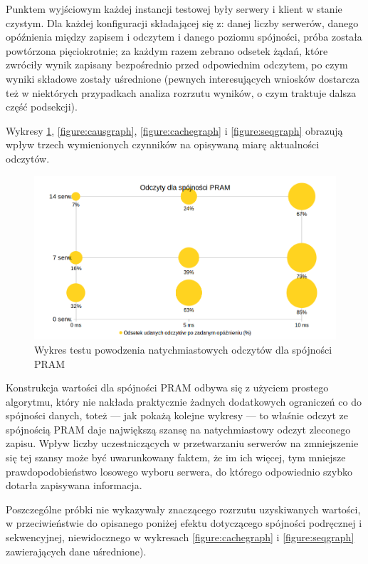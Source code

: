 Punktem wyjściowym każdej instancji testowej były serwery i klient w stanie czystym. Dla każdej konfiguracji składającej się z: danej liczby serwerów, danego opóźnienia między zapisem i odczytem i danego poziomu spójności, próba została powtórzona pięciokrotnie; za każdym razem zebrano odsetek żądań, które zwróciły wynik zapisany bezpośrednio przed odpowiednim odczytem, po czym wyniki składowe zostały uśrednione (pewnych interesujących wniosków dostarcza też w niektórych przypadkach analiza rozrzutu wyników, o czym traktuje dalsza część podsekcji).

Wykresy \ref{figure:pramgraph}, \ref{figure:causgraph}, \ref{figure:cachegraph} i \ref{figure:seqgraph} obrazują wpływ trzech wymienionych czynników na opisywaną miarę aktualności odczytów.

\begin{figure}[H]
    \includegraphics[width=\linewidth]{images/graphs/pram.png}
    \caption{Wykres testu powodzenia natychmiastowych odczytów dla spójności PRAM}
    \label{figure:pramgraph}
\end{figure}

Konstrukcja wartości dla spójności PRAM odbywa się z użyciem prostego algorytmu, który nie nakłada praktycznie żadnych dodatkowych ograniczeń co do spójności danych, toteż --- jak pokażą kolejne wykresy --- to właśnie odczyt ze spójnością PRAM daje największą szansę na natychmiastowy odczyt zleconego zapisu. Wpływ liczby uczestniczących w przetwarzaniu serwerów na zmniejszenie się tej szansy może być uwarunkowany faktem, że im ich więcej, tym mniejsze prawdopodobieństwo losowego wyboru serwera, do którego odpowiednio szybko dotarła zapisywana informacja.

Poszczególne próbki nie wykazywały znaczącego rozrzutu uzyskiwanych wartości, w przeciwieństwie do opisanego poniżej efektu dotyczącego spójności podręcznej i sekwencyjnej, niewidocznego w wykresach \ref{figure:cachegraph} i \ref{figure:seqgraph} zawierających dane uśrednione).

